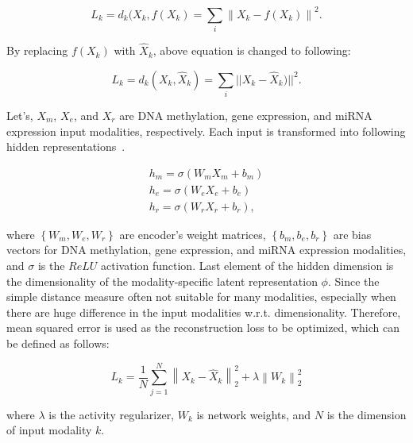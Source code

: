 \begin{equation}
    L_{k}=\text{$d_{k}$}(X_{k}, f(X_{k}) = \sum_{i} \left\|X_{k}-f(X_{k})\right\|^{2}.
\end{equation}

\hspace*{3.5mm} By replacing $f(X_{k})$ with $\hat{X}_{k}$, above equation is changed to following: 

\begin{equation}
    L_{k}=\text{$d_{k}$}(X_{k}, \hat{X}_{k}) = \sum_{i} ||X_{k}-\hat{X}_{k})||^{2}.
    \label{eq:ce_loss}
\end{equation}

\hspace*{3.5mm} Let's, $X_m$, $X_e$, and $X_r$ are DNA methylation, gene expression, and miRNA expression input modalities, respectively. Each input is transformed into following hidden representations~\cite{KarimIEEEAccess2019}.

\begin{equation}
    \begin{array}{l}
        {h_{m}=\sigma\left(W_{m} X_{m}+b_{m}\right)} \\
        {h_{e}=\sigma\left(W_{e} X_{e}+b_{e}\right)} \\
        {h_{r}=\sigma\left(W_{r} X_{r}+b_{r}\right),}
    \end{array}
    \label{eq:m1}
\end{equation}  

\hspace*{3.5mm} where $\left\{W_{m}, W_{e}, W_{r}\right\}$ are encoder's weight matrices, $\left\{b_{m}, b_{e}, b_{r}\right\}$ are bias vectors for DNA methylation, gene expression, and miRNA expression modalities, and $\sigma$ is the $ReLU$ activation function. Last element of the hidden dimension is the dimensionality of the modality-specific latent representation $\phi$. Since the simple distance measure often not suitable for many modalities, especially when there are huge difference in the input modalities w.r.t. dimensionality. Therefore, mean squared error is used as the reconstruction loss to be optimized, which can be defined as follows: 

\begin{equation}
    L_{k}=\frac{1}{N} \sum_{j=1}^{N}\left\|X_{k}-\hat{X}_{k}\right\|_{2}^{2}+\lambda\left\|W_{k}\right\|_{2}^{2}
\end{equation}  

\hspace*{3.5mm} where $\lambda$ is the activity regularizer, $W_{k}$ is network weights, and $N$ is the dimension of input modality $k$. 

